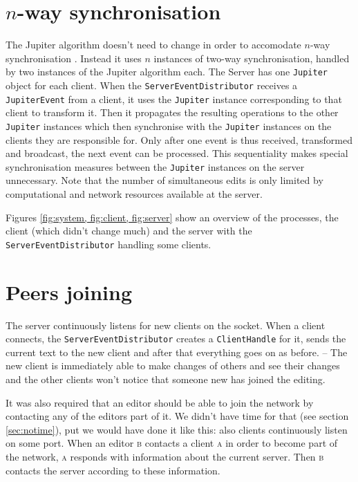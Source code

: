 \documentclass[a4paper,final,12pt,oneside,article,table]{memoir}
\newcommand{\mil}[1]{\texttt{#1}}
\begin{document}
\chapter{$n$-way synchronisation}




The Jupiter algorithm doesn't need to change in order to accomodate
$n$-way synchronisation \cite{Jupiter}. Instead it uses $n$ instances of
two-way synchronisation, handled by two instances of the Jupiter
algorithm each. The Server has one \mil{Jupiter} object for each client.
When the \mil{ServerEventDistributor} receives a \mil{JupiterEvent} from
a client, it uses the \mil{Jupiter} instance corresponding to that
client to transform it. Then it propagates the resulting operations to
the other \mil{Jupiter} instances which then synchronise with the
\mil{Jupiter} instances on the clients they are responsible for. Only
after one event is thus received, transformed and broadcast, the next
event can be processed. This sequentiality makes special synchronisation
measures between the \mil{Jupiter} instances on the server unnecessary.
Note that the number of simultaneous edits is only limited by
computational and network resources available at the server.

Figures \cref{fig:system, fig:client, fig:server} show an overview of
the processes, the client (which didn't change much) and the server with
the \mil{ServerEventDistributor} handling some clients.


\chapter{Peers joining}
\label{sec:joining}

The server continuously listens for new clients on the socket. When a
client connects, the \mil{ServerEventDistributor} creates a
\mil{ClientHandle} for it, sends the current text to the new client
and after that everything goes on as before. – The new client is
immediately able to make changes of others and see their changes and
the other clients won't notice that someone new has joined the
editing.

It was also required that an editor should be able to join the network
by contacting any of the editors part of it. We didn't have time for
that (see section \ref{sec:notime}), put we would have done it like
this: also clients continuously listen on some port. When an editor
\textsc{b} contacts a client \textsc{a} in order to become part of the
network, \textsc{a} responds with information about the current server.
Then \textsc{b} contacts the server according to these information.
\end{document}
